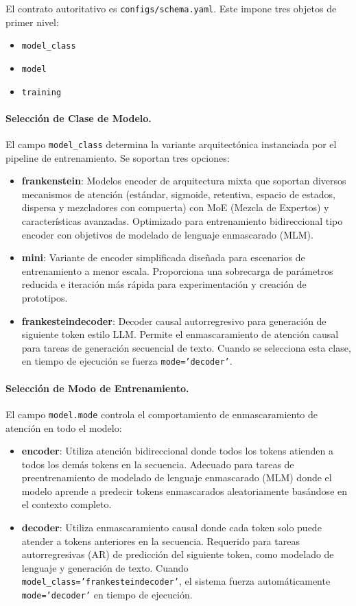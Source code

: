 \documentclass[11pt,a4paper]{article}
\begin{document}
El contrato autoritativo es \texttt{configs/schema.yaml}. Este impone tres objetos de primer nivel:
\begin{itemize}[leftmargin=*]
    \item \texttt{model\_class}
    \item \texttt{model}
    \item \texttt{training}
\end{itemize}

\paragraph{Selección de Clase de Modelo.}
El campo \texttt{model\_class} determina la variante arquitectónica instanciada por el pipeline de entrenamiento. Se soportan tres opciones:
\begin{itemize}[leftmargin=*]
    \item \textbf{frankenstein}: Modelos encoder de arquitectura mixta que soportan diversos mecanismos de atención (estándar, sigmoide, retentiva, espacio de estados, dispersa y mezcladores con compuerta) con MoE (Mezcla de Expertos) y características avanzadas. Optimizado para entrenamiento bidireccional tipo encoder con objetivos de modelado de lenguaje enmascarado (MLM).
    \item \textbf{mini}: Variante de encoder simplificada diseñada para escenarios de entrenamiento a menor escala. Proporciona una sobrecarga de parámetros reducida e iteración más rápida para experimentación y creación de prototipos.
    \item \textbf{frankesteindecoder}: Decoder causal autorregresivo para generación de siguiente token estilo LLM. Permite el enmascaramiento de atención causal para tareas de generación secuencial de texto. Cuando se selecciona esta clase, en tiempo de ejecución se fuerza \texttt{mode='decoder'}.
\end{itemize}

\paragraph{Selección de Modo de Entrenamiento.}
El campo \texttt{model.mode} controla el comportamiento de enmascaramiento de atención en todo el modelo:
\begin{itemize}[leftmargin=*]
    \item \textbf{encoder}: Utiliza atención bidireccional donde todos los tokens atienden a todos los demás tokens en la secuencia. Adecuado para tareas de preentrenamiento de modelado de lenguaje enmascarado (MLM) donde el modelo aprende a predecir tokens enmascarados aleatoriamente basándose en el contexto completo.
    \item \textbf{decoder}: Utiliza enmascaramiento causal donde cada token solo puede atender a tokens anteriores en la secuencia. Requerido para tareas autorregresivas (AR) de predicción del siguiente token, como modelado de lenguaje y generación de texto. Cuando \texttt{model\_class='frankesteindecoder'}, el sistema fuerza automáticamente \texttt{mode='decoder'} en tiempo de ejecución.
\end{itemize}
\end{document}
